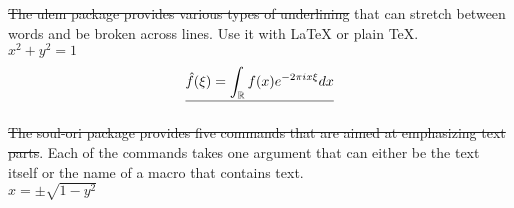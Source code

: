 \documentclass[10pt]{article}
\begin{document}
\sout{The ulem package provides various types of underlining} that can stretch between words and be broken across lines.
Use it with {\LaTeX} or plain \TeX. \\
\sout{$x^{2} + y^{2} = 1$}
$$
\sout{ \hat{f}(\xi) = \int_{\mathbb{R}} f(x) e^{-2\pi i x \xi} dx }
$$

\st{The soul-ori package provides five commands that are aimed at emphasizing text parts}.
Each of the commands takes one argument that can either be the text
itself or the name of a macro that contains text.\\
\st{$x = \pm\sqrt{1 - y^{2}}$}
\end{document}
